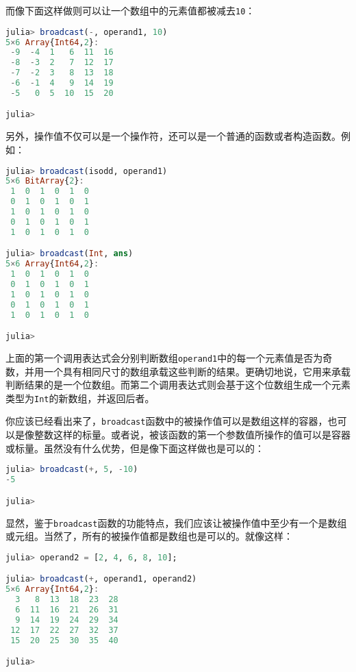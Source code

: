 而像下面这样做则可以让一个数组中的元素值都被减去\verb|10|：

\begin{lstlisting}[language=julia]
julia> broadcast(-, operand1, 10)
5×6 Array{Int64,2}:
 -9  -4  1   6  11  16
 -8  -3  2   7  12  17
 -7  -2  3   8  13  18
 -6  -1  4   9  14  19
 -5   0  5  10  15  20

julia> 
\end{lstlisting}

另外，操作值不仅可以是一个操作符，还可以是一个普通的函数或者构造函数。例如：

\begin{lstlisting}[language=julia]
julia> broadcast(isodd, operand1)
5×6 BitArray{2}:
 1  0  1  0  1  0
 0  1  0  1  0  1
 1  0  1  0  1  0
 0  1  0  1  0  1
 1  0  1  0  1  0

julia> broadcast(Int, ans)
5×6 Array{Int64,2}:
 1  0  1  0  1  0
 0  1  0  1  0  1
 1  0  1  0  1  0
 0  1  0  1  0  1
 1  0  1  0  1  0

julia> 
\end{lstlisting}

上面的第一个调用表达式会分别判断数组\verb|operand1|中的每一个元素值是否为奇数，并用一个具有相同尺寸的数组承载这些判断的结果。更确切地说，它用来承载判断结果的是一个位数组。而第二个调用表达式则会基于这个位数组生成一个元素类型为\verb|Int|的新数组，并返回后者。

你应该已经看出来了，\verb|broadcast|函数中的被操作值可以是数组这样的容器，也可以是像整数这样的标量。或者说，被该函数的第一个参数值所操作的值可以是容器或标量。虽然没有什么优势，但是像下面这样做也是可以的：

\begin{lstlisting}[language=julia]
julia> broadcast(+, 5, -10)
-5

julia> 
\end{lstlisting}

显然，鉴于\verb|broadcast|函数的功能特点，我们应该让被操作值中至少有一个是数组或元组。当然了，所有的被操作值都是数组也是可以的。就像这样：

\begin{lstlisting}[language=julia]
julia> operand2 = [2, 4, 6, 8, 10];

julia> broadcast(+, operand1, operand2)
5×6 Array{Int64,2}:
  3   8  13  18  23  28
  6  11  16  21  26  31
  9  14  19  24  29  34
 12  17  22  27  32  37
 15  20  25  30  35  40

julia> 
\end{lstlisting}

